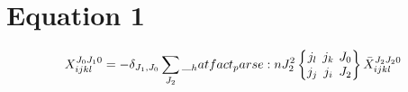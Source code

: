 \documentclass{scrartcl}
\newcommand{\sixj}[6]{\begingroup\setlength{\arraycolsep}{0.2em}\begin{Bmatrix} #1 & #2 & #3 \\ #4 & #5 & #6 \end{Bmatrix}\endgroup}
\begin{document}
\section{Equation 1}
\begin{dmath*}
X_{i j k l}^{{J}_{0} {J}_{1} 0} = -\delta_{{J}_{1},{J}_{0}} \* \sum_{{J}_{2}} \* \hatfact{{J}_{2}^{2}} \* \sixj{{j}_{l}}{{j}_{k}}{{J}_{0}}{{j}_{j}}{{j}_{i}}{{J}_{2}} \* \bar{X}_{i j k l}^{{J}_{2} {J}_{2} 0}
\end{dmath*}
\end{document}
